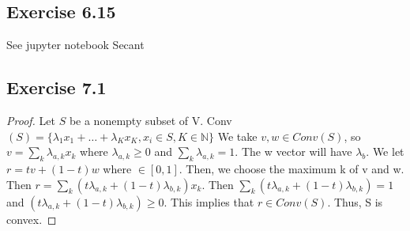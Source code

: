 \documentclass[11.5pt, letterpaper, bibtotoc,
    tablecaptionabove, figurecaptionabove]{article}
\begin{document}
\subsection*{Exercise 6.15}
See jupyter notebook Secant

\subsection*{Exercise 7.1}
\begin{proof}
Let $S$ be a nonempty subset of V.  Conv$(S) = \{ \lambda_1x_1 + \dots + \lambda_Kx_K, x_i \in S, K \in \mathbb{N} \}$
We take $v, w \in Conv(S)$, so $v = \sum_k \lambda_{a,k} x_k$ where $ \lambda_{a, k} \geq 0$ and $\sum_k \lambda_{a, k} = 1$. The w vector will have $\lambda_b$.   We let $r = tv + (1 - t)w$ where $ \in [0, 1]$.  Then,  we choose the maximum k of v and w.  Then $r = \sum_k (t\lambda_{a, k} + (1 -t)\lambda_{b, k})x_k$. Then $ \sum_k (t\lambda_{a, k} + (1 -t)\lambda_{b, k}) = 1$ and $ (t\lambda_{a, k} + (1 -t)\lambda_{b, k}) \geq 0 $.  This implies that $ r \in Conv(S)$.  Thus, S is convex.
\end{proof}
\end{document}
